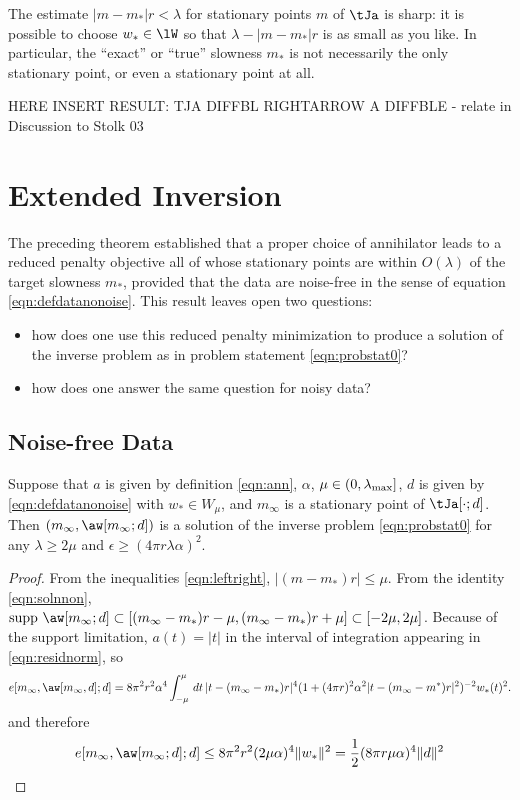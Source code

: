  The estimate $|m-m_*|r<\lambda$ for stationary
points $m$ of $\tJa$ is sharp: it is possible to choose $w_* \in \lW$
so that $\lambda - |m-m_*|r$ is as small as you like. In particular,
the ``exact'' or ``true'' slowness $m_*$ is not necessarily the only 
stationary point, or even a stationary point at all.

HERE INSERT RESULT: TJA DIFFBL RIGHTARROW A DIFFBLE - relate in
Discussion to Stolk 03

\section{Extended Inversion}
The preceding theorem established that a proper choice of annihilator
leads to a reduced penalty objective all of whose stationary points
are within $O(\lambda)$ of the target slowness $m_*$, provided that
the data are noise-free in the sense of equation
\ref{eqn:defdatanonoise}. This result leaves open two questions:
\begin{itemize}
\item how does one use this reduced penalty minimization to produce
  a solution of the inverse problem as in problem statement
  \ref{eqn:probstat0}? 
\item how does one answer the same question for noisy data?
\end{itemize}

\subsection{Noise-free Data}
\begin{theorem}
  \label{thm:ipnonoisesuf}
  Suppose that $a$ is given by definition \ref{eqn:ann}, $\alpha$,
  $\mu \in (0,\lambda_{\rm max}]$,
  $d$ is given by
  \ref{eqn:defdatanonoise} with $w_* \in W_{\mu}$, and  $m_{\infty}$ is a stationary
  point of $\tJa[\cdot;d]$. Then $(m_{\infty},\aw[m_{\infty};d])$ is a
  solution of the inverse problem \ref{eqn:probstat0} for any $\lambda
  \ge 2\mu$ and $\epsilon \ge (4\pi r \lambda \alpha)^2$.
\end{theorem}

\begin{proof}
From the
inequalities \ref{eqn:leftright}, $|(m-m_*)r|\le \mu$. From the
identity \ref{eqn:solnnon}, $\mbox{supp }\aw[m_{\infty};d] \subset
[(m_{\infty}-m_*)r-\mu,(m_{\infty}-m_*)r+\mu] \subset
[-2\mu,2\mu]$. Because of the support limitation, $a(t)=|t|$
in the interval of integration appearing in \ref{eqn:residnorm}, so
\[
  e[m_{\infty},\aw[m_{\infty},d];d] 
= 8 \pi^2 r^2 \alpha^4\int^{\mu}_{-\mu}\,dt\,|t-(m_{\infty}-m_*)r|^4(1+(4\pi r)^2 \alpha^2 
|t-(m_{\infty}-m^*)r|^2)^{-2}w_*(t)^2.
\]
and therefore
\begin{equation}
  \label{eqn:estresidnorm}
e[m_{\infty},\aw[m_{\infty};d];d] \le 8 \pi^2 r^2 (2\mu\alpha)^4 \|w_*\|^2 =
\frac{1}{2}(8 \pi r \mu \alpha)^4 \|d\|^2
\end{equation}
\end{proof}

